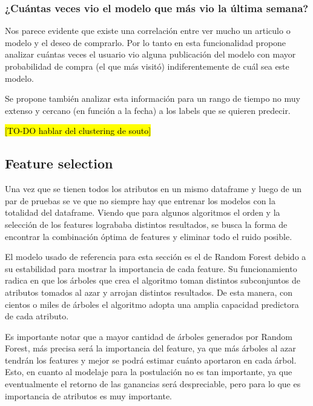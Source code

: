 \documentclass[a4paper]{article}
\begin{document}
\subsubsection{¿Cuántas veces vio el modelo que más vio la última semana?}

\begin{sloppypar}
	\texttt{}
\end{sloppypar}

Nos parece evidente que existe una correlación entre ver mucho un articulo o modelo y el deseo de comprarlo. Por lo tanto en esta funcionalidad propone analizar cuántas veces el usuario vio alguna publicación del modelo con mayor probabilidad de compra (el que más visitó) indiferentemente de cuál sea este modelo. 

Se propone también analizar esta información para un rango de tiempo no muy extenso y cercano (en función a la fecha) a los labels que se quieren predecir. 

\hl{[TO-DO hablar del clustering de souto]}

\subsection{Feature selection}

Una vez que se tienen todos los atributos en un mismo dataframe y luego de un par de pruebas se ve que no siempre hay que entrenar los modelos con la totalidad del dataframe. Viendo que para algunos algoritmos el orden y la selección de los features logrababa distintos resultados, se busca la forma de encontrar la combinación óptima de features y eliminar todo el ruido posible.

El modelo usado de referencia para esta sección es el de Random Forest debido a su estabilidad para mostrar la importancia de cada feature. Su funcionamiento radica en que los árboles que crea el algoritmo toman distintos subconjuntos de atributos tomados al azar y arrojan distintos resultados. De esta manera, con cientos o miles de árboles el algoritmo adopta una amplia capacidad predictora de cada atributo.

Es importante notar que a mayor cantidad de árboles generados por Random Forest, más precisa será la importancia del feature, ya que más árboles al azar tendrán los features y mejor se podrá estimar cuánto aportaron en cada árbol. Esto, en cuanto al modelaje para la postulación no es tan importante, ya que eventualmente el retorno de las ganancias será despreciable, pero para lo que es importancia de atributos es muy importante.
\end{document}

